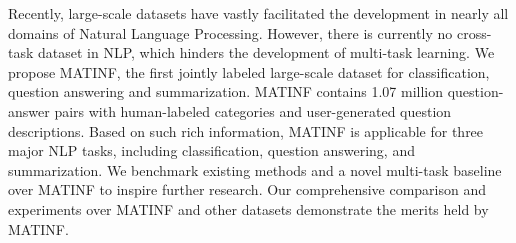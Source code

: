 Recently, large-scale datasets have vastly facilitated the development in nearly all domains of Natural Language Processing. However, there is currently no cross-task dataset in NLP, which hinders the development of multi-task learning. We propose MATINF, the first jointly labeled large-scale dataset for classification, question answering and summarization. MATINF contains 1.07 million question-answer pairs with human-labeled categories and user-generated question descriptions. Based on such rich information, MATINF is applicable for three major NLP tasks, including classification, question answering, and summarization. We benchmark existing methods and a novel multi-task baseline over MATINF to inspire further research. Our comprehensive comparison and experiments over MATINF and other datasets demonstrate the merits held by MATINF.
